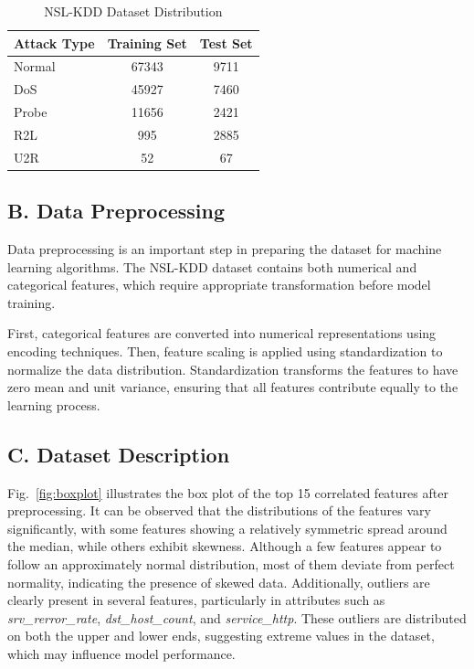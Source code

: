 \documentclass[conference]{IEEEtran}
\begin{document}
\begin{table}[h]
\centering
\caption{NSL-KDD Dataset Distribution}
\begin{tabular}{lcc}
\hline
\textbf{Attack Type} & \textbf{Training Set} & \textbf{Test Set} \\
\hline
Normal & 67343 & 9711 \\
DoS    & 45927 & 7460 \\
Probe  & 11656 & 2421 \\
R2L    & 995   & 2885 \\
U2R    & 52    & 67 \\
\hline
\end{tabular}
\label{tab:nslkdd_distribution}
\end{table}

\subsection{B. Data Preprocessing}

Data preprocessing is an important step in preparing the dataset for machine learning algorithms. The NSL-KDD dataset contains both numerical and categorical features, which require appropriate transformation before model training.

First, categorical features are converted into numerical representations using encoding techniques. Then, feature scaling is applied using standardization to normalize the data distribution. Standardization transforms the features to have zero mean and unit variance, ensuring that all features contribute equally to the learning process.

\subsection{C. Dataset Description}

Fig.~\ref{fig:boxplot}  illustrates the box plot of the top 15 correlated features after preprocessing. It can be observed that the distributions of the features vary significantly, with some features showing a relatively symmetric spread around the median, while others exhibit skewness. Although a few features appear to follow an approximately normal distribution, most of them deviate from perfect normality, indicating the presence of skewed data. Additionally, outliers are clearly present in several features, particularly in attributes such as \textit{srv\_rerror\_rate}, \textit{dst\_host\_count}, and \textit{service\_http}. These outliers are distributed on both the upper and lower ends, suggesting extreme values in the dataset, which may influence model performance.
\end{document}
